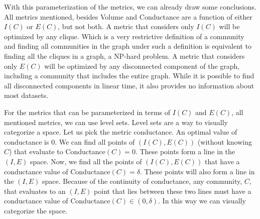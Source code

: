 \documentclass[phd,tocprelim]{cornell}
\begin{document}
 With this parameterization of the metrics, we can already draw some conclusions.  All metrics mentioned, besides {\sc Volume} and {\sc Conductance} are a function of either $I(C)$ or $E(C)$, but not both.  A metric that considers only $I(C)$ will be optimized by any clique.  Which is a very restrictive definition of a community and finding all communities in the graph under such a definition is equivalent to finding all the cliques in a graph, a NP-hard problem.  A metric that considers only $E(C)$ will be optimized by any disconnected component of the graph, including a community that includes the entire graph.  While it is possible to find all disconnected components in linear time, it also provides no information about most datasets.

For the metrics that can be parameterized in terms of $I(C)$ and $E(C)$, all mentioned metrics, we can use level sets.  Level sets are a way to visually categorize a space.  Let us pick the metric conductance.  An optimal value of conductance is $0$.  We can find all points of $(I(C), E(C))$ (without knowing $C$) that evaluate to {\sc Conductance}$(C) = 0$.  These points form a line in the $(I, E)$ space.  Now, we find all the points of $(I(C), E(C))$ that have a conductance value of {\sc Conductance}$(C) = \delta$.  These points will also form a line in the $(I, E)$ space.  Because of the continuity of conductance, any community, $C$, that evaluates to an $(I, E)$ point that lies between these two lines must have a conductance value of {\sc Conductance}$(C) \in (0, \delta)$.  In this way we can visually categorize the space.
\end{document}
